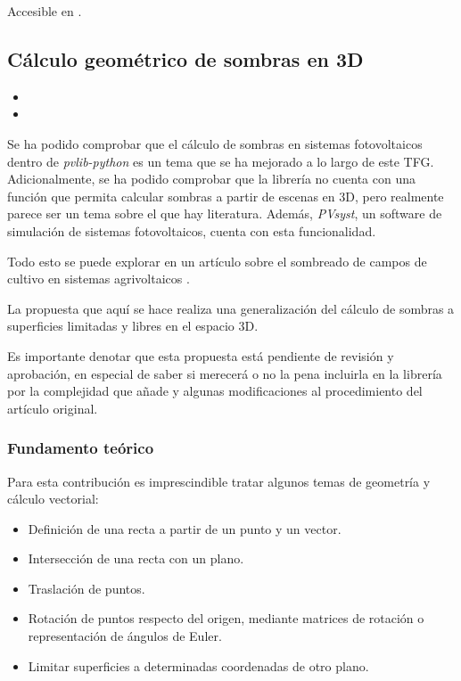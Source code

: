 Accesible en .

\subsection{Cálculo geométrico de sombras en 3D}

\begin{itemize}
    \item {}
    \item {}
\end{itemize}

Se ha podido comprobar que el cálculo de sombras en sistemas fotovoltaicos dentro de \textit{pvlib-python} es un tema que se ha mejorado a lo largo de este TFG. Adicionalmente, se ha podido comprobar que la librería no cuenta con una función que permita calcular sombras a partir de escenas en 3D, pero realmente parece ser un tema sobre el que hay literatura. Además, \textit{PVsyst}, un software de simulación de sistemas fotovoltaicos, cuenta con esta funcionalidad.

Todo esto se puede explorar en un artículo sobre el sombreado de campos de cultivo en sistemas agrivoltaicos \cite{Zainali_Ma_Lu_Stridh_Avelin_Amaducci_Colauzzi_Campana_2023}.

La propuesta que aquí se hace realiza una generalización del cálculo de sombras a superficies limitadas y libres en el espacio 3D.

Es importante denotar que esta propuesta está pendiente de revisión y aprobación, en especial de saber si merecerá o no la pena incluirla en la librería por la complejidad que añade y algunas modificaciones al procedimiento del artículo original.

\subsubsection{Fundamento teórico}

Para esta contribución es imprescindible tratar algunos temas de geometría y cálculo vectorial:

\begin{itemize}
    \item Definición de una recta a partir de un punto y un vector.
    \item Intersección de una recta con un plano.
    \item Traslación de puntos.
    \item Rotación de puntos respecto del origen, mediante matrices de rotación o representación de ángulos de Euler.
    \item Limitar superficies a determinadas coordenadas de otro plano.
\end{itemize}


